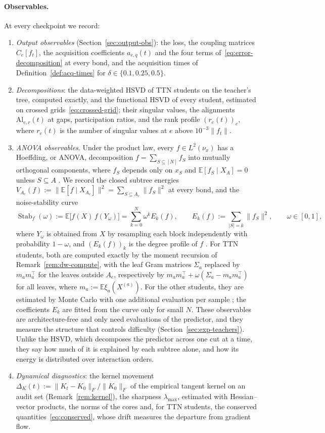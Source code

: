 \documentclass[11pt]{article}
\newcommand{\E}{\mathbb{E}}
\newcommand{\norm}[1]{\lVert #1\rVert}
\theoremstyle{definition}
\numberwithin{equation}{section}
\begin{document}
\paragraph{Observables.}
At every checkpoint we record:
\begin{enumerate}[label=(O\arabic*),leftmargin=*]
\item \emph{Output observables} (Section~\ref{sec:output-obs}): the loss, the coupling matrices $C_e[f_t]$, the acquisition coefficients $a_{e,q}(t)$ and the four terms of~\eqref{eq:error-decomposition} at every bond, and the acquisition times of Definition~\ref{def:acq-times} for $\delta\in\{0.1,0.25,0.5\}$.
\item \emph{Decompositions}: the data-weighted HSVD of TTN students on the teacher's tree, computed exactly, and the functional HSVD of every student, estimated on crossed grids~\eqref{eq:crossed-grid}; their singular values, the alignments $\mathrm{Al}_{e,r}(t)$ at gaps, participation ratios, and the rank profile $(r_e(t))_e$, where $r_e(t)$ is the number of singular values at $e$ above $10^{-3}\norm{f_t}$.
\item \emph{ANOVA observables}. Under the product law, every $f\in L^2(\nu_x)$ has a Hoeffding, or ANOVA, decomposition $f=\sum_{S\subseteq[N]}f_S$ into mutually orthogonal components, where $f_S$ depends only on $x_S$ and $\E[f_S\mid X_A]=0$ unless $S\subseteq A$ \citep{hoeffding1948class,efron1981jackknife}. We record the closed subtree energies $V_{A_e}(f):=\norm{\E[f\mid X_{A_e}]}^2=\sum_{S\subseteq A_e}\norm{f_S}^2$ at every bond, and the noise-stability curve
\[
\operatorname{Stab}_f(\omega):=\E\big[f(X)\,f(Y_\omega)\big]=\sum_{k=0}^N\omega^kE_k(f),\qquad E_k(f):=\sum_{|S|=k}\norm{f_S}^2,\qquad\omega\in[0,1],
\]
where $Y_\omega$ is obtained from $X$ by resampling each block independently with probability $1-\omega$, and $(E_k(f))_k$ is the degree profile of $f$ \citep[cf.][Chapter~2]{odonnell2014analysis}. For TTN students, both are computed exactly by the moment recursion of Remark~\ref{rem:dw-compute}, with the leaf Gram matrices $\Sigma_a$ replaced by $m_am_a^\top$ for the leaves outside $A_e$, respectively by $m_am_a^\top+\omega(\Sigma_a-m_am_a^\top)$ for all leaves, where $m_a:=\E\xi_a(X^{(a)})$. For the other students, they are estimated by Monte Carlo with one additional evaluation per sample \citep{sobol2001global}; the coefficients $E_k$ are fitted from the curve only for small $N$. These observables are architecture-free and only need evaluations of the predictor, and they measure the structure that controls difficulty (Section~\ref{sec:exp-teachers}). Unlike the HSVD, which decomposes the predictor across one cut at a time, they say how much of it is explained by each subtree alone, and how its energy is distributed over interaction orders.
\item \emph{Dynamical diagnostics}: the kernel movement $\Delta_K(t):=\norm{K_t-K_0}_F/\norm{K_0}_F$ of the empirical tangent kernel on an audit set (Remark~\ref{rem:kernel}), the sharpness $\lambda_{\max}$, estimated with Hessian--vector products, the norms of the cores and, for TTN students, the conserved quantities~\eqref{eq:conserved}, whose drift measures the departure from gradient flow.
\end{enumerate}
\end{document}
